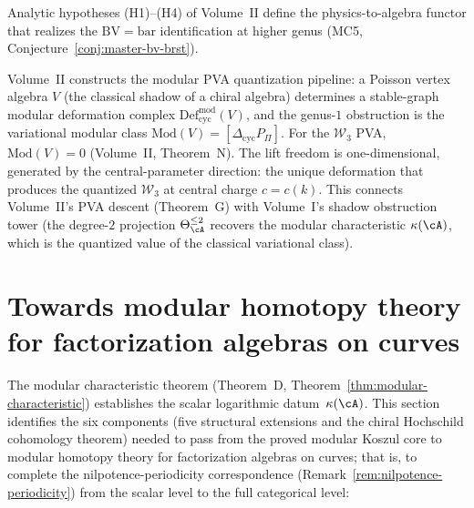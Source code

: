 \begin{conjecture}
\label{conj:vol2-bv-functor-bridge}
Analytic hypotheses (H1)--(H4) of Volume~II define the
physics-to-algebra functor that realizes the
$\mathrm{BV} = \mathrm{bar}$ identification at higher
genus (MC5, Conjecture~\ref{conj:master-bv-brst}).
\end{conjecture}

\begin{remark}
\label{rem:concordance-pva-bridge}
%
Volume~II constructs the modular PVA quantization pipeline:
a Poisson vertex algebra $V$ (the classical shadow of a
chiral algebra) determines a stable-graph modular deformation
complex $\mathrm{Def}_{\mathrm{cyc}}^{\mathrm{mod}}(V)$,
and the genus-$1$ obstruction is the variational modular class
$\mathrm{Mod}(V) = [\Delta_{\mathrm{cyc}} P_\Pi]$.
For the $\mathcal{W}_3$ PVA, $\mathrm{Mod}(V) = 0$
(Volume~II, Theorem~N). The lift freedom is one-dimensional,
generated by the central-parameter direction: the unique
deformation that produces the quantized $\mathcal{W}_3$
at central charge $c = c(k)$. This connects Volume~II's
PVA descent (Theorem~G) with Volume~I's shadow obstruction tower
(the degree-$2$ projection $\Theta_\cA^{\leq 2}$ recovers
the modular characteristic $\kappa(\cA)$, which is the
quantized value of the classical variational class).
\end{remark}


\section[Towards modular homotopy theory]{Towards modular homotopy theory for factorization algebras on curves}
\label{sec:modular-koszul-programme}

The modular characteristic theorem (Theorem~D,
Theorem~\ref{thm:modular-characteristic}) establishes the scalar
logarithmic datum~$\kappa(\cA)$. This section identifies the six
components (five structural extensions and the chiral Hochschild
cohomology theorem) needed to pass from the proved modular Koszul
core to modular homotopy theory for factorization algebras on
curves; that is, to complete the nilpotence-periodicity
correspondence
(Remark~\ref{rem:nilpotence-periodicity}) from the scalar level to
the full categorical level:

